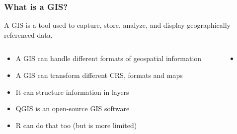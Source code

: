 \documentclass[xcolor=x11names,compress]{beamer}
\renewcommand{\(}{\begin{columns}}
\renewcommand{\)}{\end{columns}}
\newcommand{\<}[1]{\begin{column}{#1}}
\renewcommand{\>}{\end{column}}
\begin{document}
\begin{frame}
    \frametitle{What is a GIS?}
A GIS is a tool used to capture, store, analyze, and display geographically referenced data.
\pause
    \begin{columns}[T]
        \begin{column}{0.5\textwidth}
            \begin{itemize}[<+->]
                \item A GIS can handle different formats of  geospatial information
                \item A GIS can transform different CRS, formats and maps
                \item It can structure information in layers
                \item QGIS is an open-source GIS software
                \item R can do that too (but is more limited)
            \end{itemize}
        \end{column}
        \begin{column}{0.5\textwidth}
        \begin{itemize}
             \item[]
\end{itemize}
\end{column}
\end{columns}
\end{frame}
\end{document}

